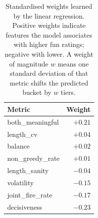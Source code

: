 \documentclass[conference]{IEEEtran}
\begin{document}
  \begin{table}[ht!]                                                            
  \centering                                                                  
  \caption{Standardised weights learned by the linear regression. Positive
  weights indicate features the model associates with higher fun ratings;
  negative with lower. A weight of magnitude $w$ means one standard deviation of
   that metric shifts the predicted bucket by $w$ tiers.}
  \label{tab:fitness_weights}                  
  \begin{tabular}{|l|r|}                
  \hline                       
  \textbf{Metric} & \textbf{Weight} \\
  \hline                    
  both\_meaningful  & $+0.21$ \\                                                
  \hline                                           
  length\_cv        & $+0.04$ \\                                                
  \hline                                                                      
  balance           & $+0.02$ \\                                     
  \hline                                           
  non\_greedy\_rate & $+0.01$ \\               
  \hline                                                                        
  length\_sanity    & $-0.04$ \\
  \hline                                                                        
  volatility        & $-0.15$ \\                                              
  \hline                                                                        
  joint\_fire\_rate & $-0.17$ \\               
  \hline                                                                        
  decisiveness     & $-0.23$ \\                                               
  \hline                                                             
  \end{tabular}                                    
  \end{table}                                                                   
                                        
\end{document}
